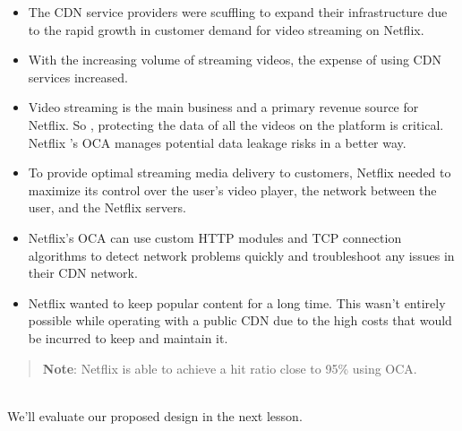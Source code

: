 \begin{itemize}
\item
\protect{}\label{YUKLcEb_xOrfAiZUlVwcM}
The CDN service providers were scuffling to expand their infrastructure due to the rapid growth in customer demand for video streaming on Netflix.
\item
\protect{}\label{y5N_jeRlMgWfKQkSqXczj}
With the increasing volume of streaming videos, the expense of using CDN services increased.
\item
\protect{}\label{ChQiFVvDuAJ4k5Zav4pYU}
Video streaming is the main business and a primary revenue source for Netflix. So , protecting the data of all the videos on the platform is critical. Netflix
's OCA manages potential data leakage risks in a better way.
\item
\protect{}\label{9uQ-5xfI9jCvdtu2pqiYi}
To provide optimal streaming media delivery to customers, Netflix needed to maximize its control over the user's video player, the network between the user, and the Netflix servers.
\item
\protect{}\label{w_EgRgRlvgtWAqhAZhbV7}
Netflix's OCA can use custom HTTP modules and TCP connection algorithms to detect network problems quickly and troubleshoot any issues in their CDN network.
\item
\protect{}\label{inmeR_Ca-Z1wbiTo_3XQt}
Netflix wanted to keep popular content for a long time. This wasn't entirely possible while operating with a public CDN due to the high costs that would be incurred to keep and maintain it.
\end{itemize}
\begin{quote}
\textbf{Note}: Netflix is able to achieve a hit ratio close to 95\% using OCA.
\end{quote}
\\
We'll evaluate our proposed design in the next lesson.

